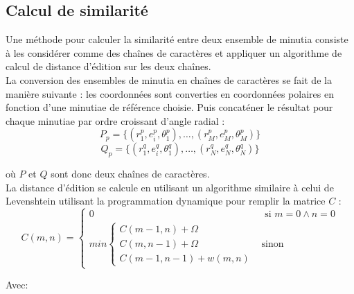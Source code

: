 \documentclass{report}
\begin{document}
\subsection{Calcul de similarité}

Une méthode pour calculer la similarité entre deux ensemble de
minutia consiste à les considérer comme des chaînes de caractères et
appliquer un algorithme de calcul de distance d'édition sur les deux
chaînes.\\

La conversion des ensembles de minutia en chaînes de caractères se
fait de la manière suivante : les coordonnées sont converties en
coordonnées polaires en fonction d'une minutiae de référence
choisie. Puis concaténer le résultat pour chaque minutiae par ordre
croissant d'angle radial :
$$P_p = \{(r_{1}^p, e_{i}^p, \theta_{1}^p), \ldots, (r_{M}^p, e_{M}^p, \theta_{M}^p)\}$$
$$Q_p = \{(r_{1}^q, e_{i}^q, \theta_{1}^q), \ldots, (r_{N}^q, e_{N}^q, \theta_{N}^q)\}$$

où $P$ et $Q$ sont donc deux chaînes de caractères.\\
La distance d'édition se calcule en utilisant un algorithme similaire
à celui de Levenshtein utilisant la programmation dynamique pour
remplir la matrice $C$ :
$$C(m,n) = \left \{
\begin{array}{ll}
  0 & \mbox{ si } m = 0 \land n = 0\\
  min \left \{
      \begin{array}{l}
        C(m - 1, n) + \Omega\\
        C(m, n - 1) + \Omega\\
        C(m - 1, n - 1) + w(m, n)
      \end{array}  \right . & \mbox {sinon }
\end{array} \right .
$$

Avec:
\end{document}
